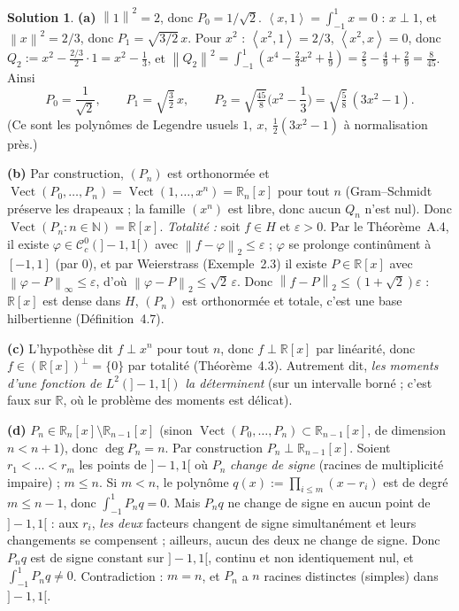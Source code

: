 \documentclass[11pt,a4paper]{article}
\newcommand{\R}{\mathbb{R}}
\newcommand{\N}{\mathbb{N}}
\newcommand{\Vect}{\operatorname{Vect}}
\newcommand{\norm}[1]{\left\|#1\right\|}
\newcommand{\ps}[2]{\left\langle #1,#2\right\rangle}
\newcommand{\Cc}{\mathcal{C}^0_c}
\theoremstyle{definition}
\newtheorem*{solution}{Solution}
\begin{document}
\begin{solution}
\noindent\textbf{(a)} $\norm1^2=2$, donc $P_0=1/\sqrt2$. $\ps x1=\int_{-1}^1x=0$ : $x\perp1$, et $\norm x^2=2/3$, donc $P_1=\sqrt{3/2}\,x$. Pour $x^2$ : $\ps{x^2}1=2/3$, $\ps{x^2}x=0$, donc $Q_2:=x^2-\frac{2/3}{2}\cdot1=x^2-\frac13$, et $\norm{Q_2}^2=\int_{-1}^1(x^4-\frac23x^2+\frac19)=\frac25-\frac49+\frac29=\frac8{45}$. Ainsi
\[
P_0=\frac1{\sqrt2},\qquad P_1=\sqrt{\tfrac32}\,x,\qquad P_2=\sqrt{\tfrac{45}8}\Big(x^2-\frac13\Big)=\sqrt{\tfrac58}\,(3x^2-1).
\]
(Ce sont les polynômes de Legendre usuels $1,\ x,\ \frac12(3x^2-1)$ à normalisation près.)

\medskip
\noindent\textbf{(b)} Par construction, $(P_n)$ est orthonormée et $\Vect(P_0,\dots,P_n)=\Vect(1,\dots,x^n)=\R_n[x]$ pour tout $n$ (Gram--Schmidt préserve les drapeaux ; la famille $(x^n)$ est libre, donc aucun $Q_n$ n'est nul). Donc $\Vect(P_n:n\in\N)=\R[x]$. \emph{Totalité :} soit $f\in H$ et $\varepsilon>0$. Par le Théorème~A.4, il existe $\varphi\in\Cc(]-1,1[)$ avec $\norm{f-\varphi}_2\le\varepsilon$ ; $\varphi$ se prolonge continûment à $[-1,1]$ (par $0$), et par Weierstrass (Exemple~2.3) il existe $P\in\R[x]$ avec $\norm{\varphi-P}_\infty\le\varepsilon$, d'où $\norm{\varphi-P}_2\le\sqrt2\,\varepsilon$. Donc $\norm{f-P}_2\le(1+\sqrt2)\varepsilon$ : $\R[x]$ est dense dans $H$, $(P_n)$ est orthonormée et totale, c'est une base hilbertienne (Définition~4.7).

\medskip
\noindent\textbf{(c)} L'hypothèse dit $f\perp x^n$ pour tout $n$, donc $f\perp\R[x]$ par linéarité, donc $f\in(\R[x])^\perp=\{0\}$ par totalité (Théorème~4.3). Autrement dit, \emph{les moments d'une fonction de $L^2(]-1,1[)$ la déterminent} (sur un intervalle borné ; c'est faux sur $\R$, où le problème des moments est délicat).

\medskip
\noindent\textbf{(d)} $P_n\in\R_n[x]\setminus\R_{n-1}[x]$ (sinon $\Vect(P_0,\dots,P_n)\subset\R_{n-1}[x]$, de dimension $n<n+1$), donc $\deg P_n=n$. Par construction $P_n\perp\R_{n-1}[x]$. Soient $r_1<\dots<r_m$ les points de $]-1,1[$ où $P_n$ \emph{change de signe} (racines de multiplicité impaire) ; $m\le n$. Si $m<n$, le polynôme $q(x):=\prod_{i\le m}(x-r_i)$ est de degré $m\le n-1$, donc $\int_{-1}^1P_nq=0$. Mais $P_nq$ ne change de signe en aucun point de $]-1,1[$ : aux $r_i$, \emph{les deux} facteurs changent de signe simultanément et leurs changements se compensent ; ailleurs, aucun des deux ne change de signe. Donc $P_nq$ est de signe constant sur $]-1,1[$, continu et non identiquement nul, et $\int_{-1}^1P_nq\ne0$. Contradiction : $m=n$, et $P_n$ a $n$ racines distinctes (simples) dans $]-1,1[$.
\end{solution}
\end{document}
